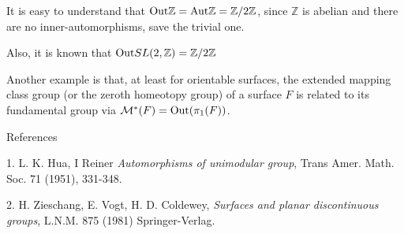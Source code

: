 \documentclass[12pt]{article}
\begin{document}
It is easy to understand that ${\rm Out}\mathbb{Z}={\rm Aut}\mathbb{Z}=\mathbb{Z}/2\mathbb{Z}$, since $\mathbb{Z}$ is abelian and there are no inner-automorphisms, save the trivial one.

Also, it is known that ${\rm Out} SL(2,\mathbb{Z})=\mathbb{Z}/2\mathbb{Z}$

Another example is that, at least for orientable surfaces, the extended mapping class group (or the zeroth homeotopy group) of a surface $F$ is related to its fundamental group via ${\cal{M}^*}(F)={\rm Out}(\pi_1(F))$.


References

1. L. K. Hua, I Reiner {\it Automorphisms of unimodular group}, Trans Amer. Math. Soc. 71 (1951), 331-348.

2. H. Zieschang, E. Vogt, H. D. Coldewey, {\it Surfaces and planar discontinuous groups}, L.N.M. 875 (1981) Springer-Verlag. 
\end{document}
